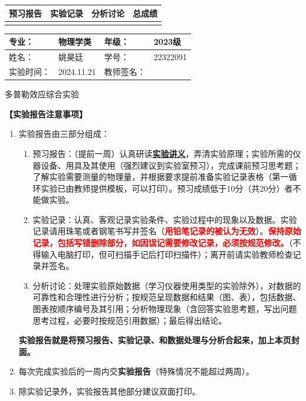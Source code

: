 \documentclass[dvipsnames, svgnames,a4paper,11pt]{article}
\begin{document}
\begin{table}
	\renewcommand\arraystretch{1.7}
	\begin{tabularx}{\textwidth}{
		|X|X|X|X
		|X|X|X|X|}
	\hline
	\multicolumn{2}{|c|}{预习报告}&\multicolumn{2}{|c|}{实验记录}&\multicolumn{2}{|c|}{分析讨论}&\multicolumn{2}{|c|}{总成绩}\\
	\hline
	 & &  & &  & &  & \\
	\hline
	\end{tabularx}
\end{table}


\begin{table}
	\renewcommand\arraystretch{1.7}
	\begin{tabularx}{\textwidth}{|X|X|X|X|}
	\hline
	专业：& 物理学类 &年级：& 2023级\\
	\hline
	姓名：& 姚昊廷  & 学号：&22322091\\
	\hline
	实验时间：& 2024.11.21& 教师签名：& \\
	\hline
	\end{tabularx}
\end{table}

\begin{center}
	\LARGE 多普勒效应综合实验
\end{center}

\textbf{【实验报告注意事项】}
\begin{enumerate}
	\item 实验报告由三部分组成：
	\begin{enumerate}
		\item 预习报告：（提前一周）认真研读\underline{\textbf{实验讲义}}，弄清实验原理；实验所需的仪器设备、用具及其使用（强烈建议到实验室预习），完成课前预习思考题；了解实验需要测量的物理量，并根据要求提前准备实验记录表格（第一循环实验已由教师提供模板，可以打印）。预习成绩低于10分（共20分）者不能做实验。
	    \item 实验记录：认真、客观记录实验条件、实验过程中的现象以及数据。实验记录请用珠笔或者钢笔书写并签名（\textcolor{red}{\textbf{用铅笔记录的被认为无效}}）。\textcolor{red}{\textbf{保持原始记录，包括写错删除部分，如因误记需要修改记录，必须按规范修改。}}（不得输入电脑打印，但可扫描手记后打印扫描件）；离开前请实验教师检查记录并签名。
	    \item 分析讨论：处理实验原始数据（学习仪器使用类型的实验除外），对数据的可靠性和合理性进行分析；按规范呈现数据和结果（图、表），包括数据、图表按顺序编号及其引用；分析物理现象（含回答实验思考题，写出问题思考过程，必要时按规范引用数据）；最后得出结论。
	\end{enumerate}
	\textbf{实验报告就是将预习报告、实验记录、和数据处理与分析合起来，加上本页封面。}
	\item 每次完成实验后的一周内交\textbf{实验报告}（特殊情况不能超过两周）。
	\item 除实验记录外，实验报告其他部分建议双面打印。
\end{enumerate}
\end{document}
